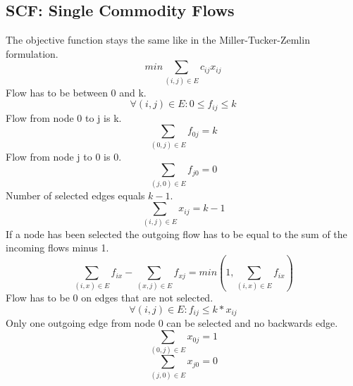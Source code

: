 \documentclass{article}
\begin{document}
\subsection{SCF: Single Commodity Flows \label{scf}}
The objective function stays the same like in the Miller-Tucker-Zemlin formulation.
\setcounter{equation}{0}
\begin{equation}
min \sum_{(i,j) \in E} c_{ij} x_{ij}
\end{equation}
Flow has to be between 0 and k.
\begin{equation}
\forall (i,j) \in E : 0 \le f_{ij} \le k 
\end{equation}
Flow from node 0 to j is k.
\begin{equation}
\sum_{(0,j) \in E} f_{0j} = k
\end{equation}
Flow from node j to 0 is 0.
\begin{equation}
\sum_{(j,0) \in E} f_{j0} = 0
\end{equation}
Number of selected edges equals $k-1$.
\begin{equation}
\sum_{(i,j) \in E} x_{ij} = k - 1
\end{equation}
If a node has been selected the outgoing flow has to be equal to the sum of the incoming flows minus 1. 
\begin{equation}
\sum_{(i,x) \in E} f_{ix} - \sum_{(x,j) \in E} f_{xj} = min(1, \sum_{(i,x) \in E} f_{ix})
\end{equation}
Flow has to be 0 on edges that are not selected.
\begin{equation}
\forall (i,j) \in E : f_{ij} \le k*x_{ij}
\end{equation}
Only one outgoing edge from node 0 can be selected and no backwards edge.
\begin{equation}
\sum_{(0,j) \in E} x_{0j} = 1
\end{equation}
\begin{equation}
\sum_{(j,0) \in E} x_{j0} = 0
\end{equation}
\end{document}
